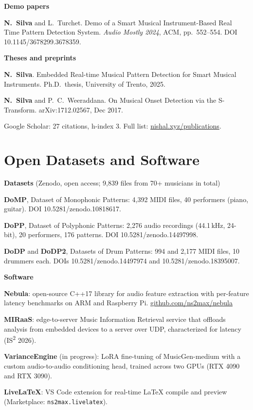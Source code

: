 \documentclass[11pt]{article}
\begin{document}
\textbf{Demo papers}
\begin{publist}[resume=pub]
  \item \textbf{N.\ Silva} and L.\ Turchet. Demo of a Smart Musical Instrument-Based Real Time Pattern Detection System. \textit{Audio Mostly 2024}, ACM, pp.\ 552--554. DOI 10.1145/3678299.3678359.
\end{publist}
\textbf{Theses and preprints}
\begin{publist}[resume=pub]
  \item \textbf{N.\ Silva}. Embedded Real-time Musical Pattern Detection for Smart Musical Instruments. Ph.D.\ thesis, University of Trento, 2025.
  \item \textbf{N.\ Silva} and P.\ C.\ Weeraddana. On Musical Onset Detection via the S-Transform. arXiv:1712.02567, Dec 2017.
\end{publist}
{\small Google Scholar: 27 citations, h-index 3. Full list: \href{https://nishal.xyz/publications}{nishal.xyz/publications}.}

\section*{Open Datasets and Software}
\textbf{Datasets} (Zenodo, open access; 9{,}839 files from 70+ musicians in total)
\begin{cvlist}
  \item \textbf{DoMP}, Dataset of Monophonic Patterns: 4{,}392 MIDI files, 40 performers (piano, guitar). DOI 10.5281/zenodo.10818617.
  \item \textbf{DoPP}, Dataset of Polyphonic Patterns: 2{,}276 audio recordings (44.1\,kHz, 24-bit), 20 performers, 176 patterns. DOI 10.5281/zenodo.14497998.
  \item \textbf{DoDP} and \textbf{DoDP2}, Datasets of Drum Patterns: 994 and 2{,}177 MIDI files, 10 drummers each. DOIs 10.5281/zenodo.14497974 and 10.5281/zenodo.18395007.
\end{cvlist}
\textbf{Software}
\begin{cvlist}
  \item \textbf{Nebula}: open-source C++17 library for audio feature extraction with per-feature latency benchmarks on ARM and Raspberry Pi. \href{https://github.com/ns2max/nebula}{github.com/ns2max/nebula}
  \item \textbf{MIRaaS}: edge-to-server Music Information Retrieval service that offloads analysis from embedded devices to a server over UDP, characterized for latency (IS\textsuperscript{2} 2026).
  \item \textbf{VarianceEngine} (in progress): LoRA fine-tuning of MusicGen-medium with a custom audio-to-audio conditioning head, trained across two GPUs (RTX 4090 and RTX 3090).
  \item \textbf{LiveLaTeX}: VS Code extension for real-time LaTeX compile and preview (Marketplace: \texttt{ns2max.livelatex}).
\end{cvlist}
\end{document}
